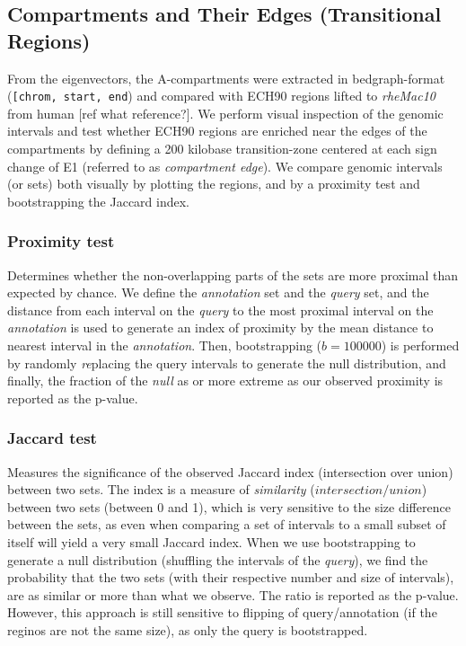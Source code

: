 \documentclass[
  11pt,
  a4paper,
]{scrbook}
\let\oldemph\emph
\renewcommand\emph[1]{\oldemph{\color{gray}#1}}
\begin{document}
\subsection{Compartments and Their Edges (Transitional
Regions)}\label{compartments-and-their-edges-transitional-regions}

From the eigenvectors, the A-compartments were extracted in
bedgraph-format
(\texttt{{[}\textquotesingle{}chrom\textquotesingle{},\ \textquotesingle{}start\textquotesingle{},\ \textquotesingle{}end\textquotesingle{}{]}})
and compared with ECH90 regions lifted to \emph{rheMac10} from human
{[}ref what reference?{]}. We perform visual inspection of the genomic
intervals and test whether ECH90 regions are enriched near the edges of
the compartments by defining a 200 kilobase transition-zone centered at
each sign change of E1 (referred to as \emph{compartment edge}). We
compare genomic intervals (or sets) both visually by plotting the
regions, and by a proximity test and bootstrapping the Jaccard index.

\subsubsection{Proximity test}\label{proximity-test}

Determines whether the non-overlapping parts of the sets are more
proximal than expected by chance. We define the \emph{annotation} set
and the \emph{query} set, and the distance from each interval on the
\emph{query} to the most proximal interval on the \emph{annotation} is
used to generate an index of proximity by the mean distance to nearest
interval in the \emph{annotation}. Then, bootstrapping (\(b = 100000\))
is performed by randomly \emph{re}placing the query intervals to
generate the null distribution, and finally, the fraction of the
\emph{null} as or more extreme as our observed proximity is reported as
the p-value.

\subsubsection{Jaccard test}\label{jaccard-test}

Measures the significance of the observed Jaccard index (intersection
over union) between two sets. The index is a measure of
\emph{similarity} (\(intersection/union\)) between two sets (between 0
and 1), which is very sensitive to the size difference between the sets,
as even when comparing a set of intervals to a small subset of itself
will yield a very small Jaccard index. When we use bootstrapping to
generate a null distribution (shuffling the intervals of the
\emph{query}), we find the probability that the two sets (with their
respective number and size of intervals), are as similar or more than
what we observe. The ratio is reported as the p-value. However, this
approach is still sensitive to flipping of query/annotation (if the
reginos are not the same size), as only the query is bootstrapped.
\end{document}
